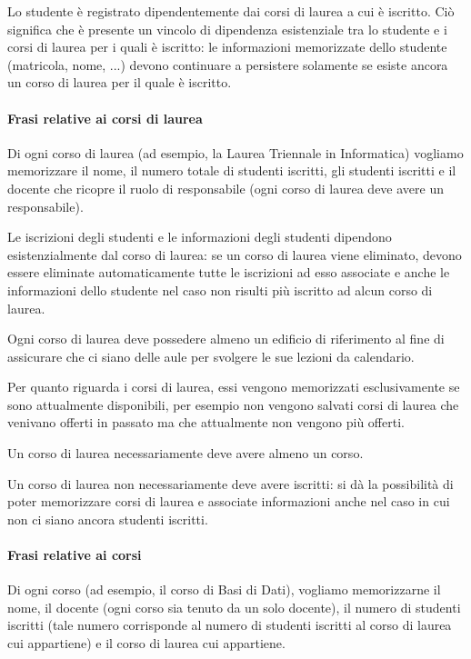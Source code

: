 \documentclass[a4paper,11pt]{article}
\begin{document}
Lo studente è registrato dipendentemente dai corsi di laurea a cui è iscritto. Ciò significa che è presente un vincolo di dipendenza esistenziale tra lo studente e i corsi di laurea per i quali è iscritto: le informazioni memorizzate dello studente (matricola, nome, ...) devono continuare a persistere solamente se esiste ancora un corso di laurea per il quale è iscritto.


\paragraph{Frasi relative ai corsi di laurea}

Di ogni corso di laurea (ad esempio, la Laurea Triennale in Informatica) vogliamo memorizzare il nome, il numero totale di studenti iscritti, gli studenti iscritti e il docente che ricopre il ruolo di responsabile (ogni corso di laurea deve avere un responsabile).

Le iscrizioni degli studenti e le informazioni degli studenti dipendono esistenzialmente dal corso di laurea: se un corso di laurea viene eliminato, devono essere eliminate automaticamente tutte le iscrizioni ad esso associate e anche le informazioni dello studente nel caso non risulti più iscritto ad alcun corso di laurea.

Ogni corso di laurea deve possedere almeno un edificio di riferimento al fine di assicurare che ci siano delle aule per svolgere le sue lezioni da calendario.

Per quanto riguarda i corsi di laurea, essi vengono memorizzati esclusivamente se sono attualmente disponibili, per esempio non vengono salvati corsi di laurea che venivano offerti in passato ma che attualmente non vengono più offerti.

Un corso di laurea necessariamente deve avere almeno un corso.

Un corso di laurea non necessariamente deve avere iscritti: si dà la possibilità di poter memorizzare corsi di laurea e associate informazioni anche nel caso in cui non ci siano ancora studenti iscritti.



\paragraph{Frasi relative ai corsi}

Di ogni corso (ad esempio, il corso di Basi di Dati), vogliamo memorizzarne il nome, il docente (ogni corso sia tenuto da un solo docente), il numero di studenti iscritti (tale numero corrisponde al numero di studenti iscritti al corso di laurea cui appartiene) e il corso di laurea cui appartiene.
\end{document}
